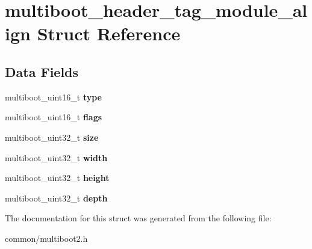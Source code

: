 \hypertarget{structmultiboot__header__tag__module__align}{}\section{multiboot\+\_\+header\+\_\+tag\+\_\+module\+\_\+align Struct Reference}
\label{structmultiboot__header__tag__module__align}
\subsection*{Data Fields}
\begin{DoxyCompactItemize}
\item 
multiboot\+\_\+uint16\+\_\+t {\bfseries type}\hypertarget{structmultiboot__header__tag__module__align_ab7e2ea5c749083992b71229c69b946e4}{}\label{structmultiboot__header__tag__module__align_ab7e2ea5c749083992b71229c69b946e4}

\item 
multiboot\+\_\+uint16\+\_\+t {\bfseries flags}\hypertarget{structmultiboot__header__tag__module__align_a6c7093954cb981ff9431dccc1f7c7aa9}{}\label{structmultiboot__header__tag__module__align_a6c7093954cb981ff9431dccc1f7c7aa9}

\item 
multiboot\+\_\+uint32\+\_\+t {\bfseries size}\hypertarget{structmultiboot__header__tag__module__align_a624e0ed5b28b1f5b82cc5ef8ce9b92cc}{}\label{structmultiboot__header__tag__module__align_a624e0ed5b28b1f5b82cc5ef8ce9b92cc}

\item 
multiboot\+\_\+uint32\+\_\+t {\bfseries width}\hypertarget{structmultiboot__header__tag__module__align_ae6fbdaebf1bf4999ff440f3f715cd330}{}\label{structmultiboot__header__tag__module__align_ae6fbdaebf1bf4999ff440f3f715cd330}

\item 
multiboot\+\_\+uint32\+\_\+t {\bfseries height}\hypertarget{structmultiboot__header__tag__module__align_ad583025adb4c3abaabbe94b23c28310b}{}\label{structmultiboot__header__tag__module__align_ad583025adb4c3abaabbe94b23c28310b}

\item 
multiboot\+\_\+uint32\+\_\+t {\bfseries depth}\hypertarget{structmultiboot__header__tag__module__align_a7e607b121d087dc13c9948cb1117688f}{}\label{structmultiboot__header__tag__module__align_a7e607b121d087dc13c9948cb1117688f}

\end{DoxyCompactItemize}


The documentation for this struct was generated from the following file\+:\begin{DoxyCompactItemize}
\item 
common/multiboot2.\+h\end{DoxyCompactItemize}
